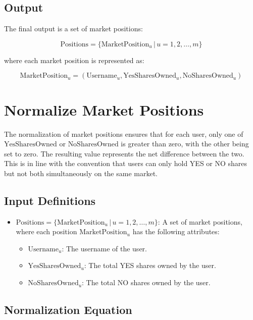 \documentclass{article}
\begin{document}
\subsection*{Output}

The final output is a set of market positions:

\[
\text{Positions} = \{ \text{MarketPosition}_u \,|\, u = 1, 2, \dots, m \}
\]

where each market position is represented as:

\[
\text{MarketPosition}_u = (\text{Username}_u, \text{YesSharesOwned}_u, \text{NoSharesOwned}_u)
\]

\section*{Normalize Market Positions}

The normalization of market positions ensures that for each user, only one of \(\text{YesSharesOwned}\) or \(\text{NoSharesOwned}\) is greater than zero, with the other being set to zero. The resulting value represents the net difference between the two.  This is in line with the convention that users can only hold YES or NO shares but not both simultaneously on the same market.

\subsection*{Input Definitions}

\begin{itemize}
    \item \(\text{Positions} = \{ \text{MarketPosition}_u \,|\, u = 1, 2, \dots, m \}\): A set of market positions, where each position \(\text{MarketPosition}_u\) has the following attributes:
    \begin{itemize}
        \item \(\text{Username}_u\): The username of the user.
        \item \(\text{YesSharesOwned}_u\): The total YES shares owned by the user.
        \item \(\text{NoSharesOwned}_u\): The total NO shares owned by the user.
    \end{itemize}
\end{itemize}

\subsection*{Normalization Equation}
\end{document}
